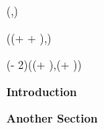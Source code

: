 \documentclass[dark]{cgem-poster}
\begin{document}
  \begin{textblock*}{\PosterColumnTwoWidth{}}(\PosterColumnTwoLeft{},\PosterColumnTwoTop{})
    \begin{minipage}[t][\PosterColumnTwoHeight{}][t]{\PosterColumnTwoWidth{}}
    \end{minipage}
  \end{textblock*}

  \newcommand{\PosterColumnThreeLeft}{\dimexpr (\PosterColumnTwoLeft + \PosterColumnTwoWidth + \PosterInnerMarginSize)\relax}
  \newcommand{\PosterColumnThreeWidth}{\PosterColumnWidth}
  \newcommand{\PosterColumnThreeTop}{\PosterInnerTop}
  \newcommand{\PosterColumnThreeHeight}{\PosterInnerHeight}

  \begin{textblock*}{\PosterColumnThreeWidth{}}(\PosterColumnThreeLeft{},\PosterColumnThreeTop{})
    \begin{minipage}[t][\PosterColumnThreeHeight{}][t]{\PosterColumnThreeWidth{}}
    \end{minipage}
  \end{textblock*}

 
  \newlength{\PosterTextMarginSize}
  \setlength{\PosterTextMarginSize}{1cm}

  \newcommand{\PosterColumnOneTextLeft}{\dimexpr (\PosterColumnOneLeft + \PosterTextMarginSize)\relax}
  \newcommand{\PosterColumnOneTextWidth}{\dimexpr (\PosterColumnOneWidth - 2\PosterTextMarginSize)\relax}
  \newcommand{\PosterColumnOneTextTop}{\dimexpr (\PosterColumnOneTop + \PosterTextMarginSize)\relax}
  \newcommand{\PosterColumnOneTextHeight}{\dimexpr (\PosterColumnOneHeight - 2\PosterTextMarginSize)\relax}

  \begin{textblock*}{\PosterColumnOneTextWidth{}}(\PosterColumnOneTextLeft{},\PosterColumnOneTextTop{})
    \begin{minipage}[t][\PosterColumnOneTextHeight{}][t]{\PosterColumnOneTextWidth{}}
      \vspace{5mm}
      \begin{center}
        \large
        \textbf{Introduction}
      \end{center}
      \vspace{5mm}
      \small
      \lipsum[1]
      \vspace{1cm}

      \begin{center}
        \large
        \textbf{Another Section}
      \end{center}
      \vspace{5mm}
      \small
      \lipsum[2]
    \end{minipage}
  \end{textblock*}
\end{document}
